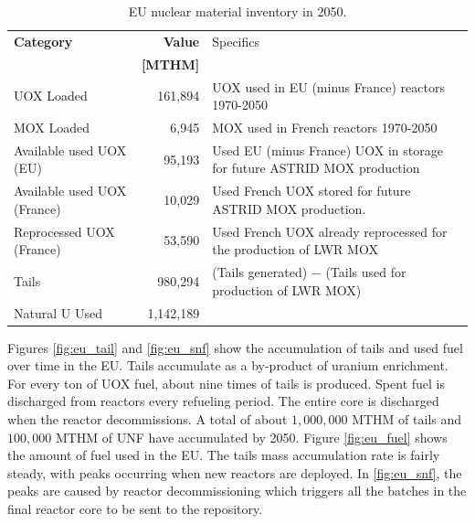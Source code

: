 \documentclass{article}
\begin{document}
\begin{table}[h]
    \centering
        \caption{\gls{EU} nuclear material inventory in 2050.}
\begin{tabularx}{\textwidth}{XrX}
            \hline
                        \textbf{Category} & \textbf{Value} & Specifics \\
                                          & \textbf{[MTHM]} & \\ \hline
                        UOX Loaded  & 161,894 & UOX used in EU (minus France) reactors 1970-2050\\ 
            MOX Loaded  & 6,945  & MOX used in French reactors 1970-2050\\
                        Available used UOX (EU)  & 95,193  & Used EU (minus France) 
                                UOX in storage for future ASTRID MOX 
                                production\\
                        Available used UOX (France) & 
                                10,029  & Used French UOX stored for 
                                future ASTRID MOX production. \\
                                Reprocessed UOX (France) & 53,590 & Used French UOX already reprocessed for the production of LWR MOX \\
            Tails  & 980,294  & (Tails generated) $-$ (Tails used for production of LWR MOX) \\ 
            Natural U Used  & 1,142,189  & \\ \hline
        \end{tabularx}
        
        \label{tab:sim_result1}
\end {table}
\FloatBarrier


Figures \ref{fig:eu_tail} and \ref{fig:eu_snf} show the 
accumulation of tails and used fuel over time in the \gls{EU}.
Tails accumulate as a by-product of uranium enrichment. For every
ton of \gls{UOX} fuel, about nine times of tails is produced. 
Spent fuel is discharged from reactors every refueling period.
The entire core is discharged when the reactor decommissions.
A total of about $1,000,000$ MTHM of tails and $100,000$ MTHM of
\gls{UNF} have accumulated by 2050.
Figure \ref{fig:eu_fuel} shows the amount of fuel used in the \gls{EU}. The 
tails mass accumulation rate is fairly steady, with peaks occurring when new 
reactors are deployed.
In \cref{fig:eu_snf}, the peaks are caused by reactor decommissioning which 
triggers all the batches in the final reactor core to be sent to the repository.
\end{document}
